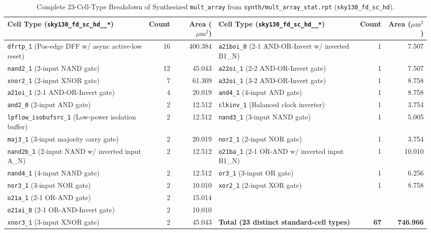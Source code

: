 \documentclass[conference,10pt]{IEEEtran}
\begin{document}
\begin{table}[!t]
    \centering
    \caption{Complete 23-Cell-Type Breakdown of Synthesized \texttt{mult\_array} from \texttt{synth/mult\_array\_stat.rpt} (\texttt{sky130\_fd\_sc\_hd}).}
    \label{tab:partB_breakdown}
    \footnotesize
    \begin{tabularx}{\textwidth}{@{}X r r | X r r@{}}
        \toprule
        \textbf{Cell Type (\texttt{sky130\_fd\_sc\_hd\_\_*})} & \textbf{Count} & \textbf{Area ($\mu\text{m}^2$)} & \textbf{Cell Type (\texttt{sky130\_fd\_sc\_hd\_\_*})} & \textbf{Count} & \textbf{Area ($\mu\text{m}^2$)} \\
        \midrule
        \texttt{dfrtp\_1} (Pos-edge DFF w/ async active-low reset) & 16 & 400.384 & \texttt{a21boi\_0} (2-1 AND-OR-Invert w/ inverted B1\_N) & 1 & 7.507 \\
        \texttt{nand2\_1} (2-input NAND gate) & 12 & 45.043 & \texttt{a22oi\_1} (2-2 AND-OR-Invert gate) & 1 & 7.507 \\
        \texttt{xnor2\_1} (2-input XNOR gate) & 7 & 61.309 & \texttt{a32oi\_1} (3-2 AND-OR-Invert gate) & 1 & 8.758 \\
        \texttt{a21oi\_1} (2-1 AND-OR-Invert gate) & 4 & 20.019 & \texttt{and4\_1} (4-input AND gate) & 1 & 8.758 \\
        \texttt{and2\_0} (2-input AND gate) & 2 & 12.512 & \texttt{clkinv\_1} (Balanced clock inverter) & 1 & 3.754 \\
        \texttt{lpflow\_isobufsrc\_1} (Low-power isolation buffer) & 2 & 12.512 & \texttt{nand3\_1} (3-input NAND gate) & 1 & 5.005 \\
        \texttt{maj3\_1} (3-input majority carry gate) & 2 & 20.019 & \texttt{nor2\_1} (2-input NOR gate) & 1 & 3.754 \\
        \texttt{nand2b\_1} (2-input NAND w/ inverted input A\_N) & 2 & 12.512 & \texttt{o21ba\_1} (2-1 OR-AND w/ inverted input B1\_N) & 1 & 10.010 \\
        \texttt{nand4\_1} (4-input NAND gate) & 2 & 12.512 & \texttt{or3\_1} (3-input OR gate) & 1 & 6.256 \\
        \texttt{nor3\_1} (3-input NOR gate) & 2 & 10.010 & \texttt{xor2\_1} (2-input XOR gate) & 1 & 8.758 \\
        \texttt{o21a\_1} (2-1 OR-AND gate) & 2 & 15.014 & & & \\
        \texttt{o21ai\_0} (2-1 OR-AND-Invert gate) & 2 & 10.010 & & & \\
        \texttt{xnor3\_1} (3-input XNOR gate) & 2 & 45.043 & \textbf{Total (23 distinct standard-cell types)} & \textbf{67} & \textbf{746.966} \\
        \bottomrule
    \end{tabularx}
\end{table}
\end{document}

